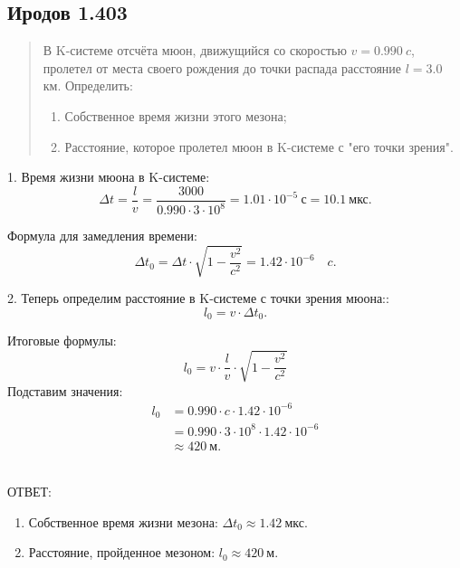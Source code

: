 \subsection*{Иродов 1.403}

\setcounter{equation}{0}

\begin{abstract}
В K-системе отсчёта мюон, движущийся со скоростью $v = 0.990 \ c$, пролетел от места своего рождения до точки распада расстояние $l = 3.0$ км. Определить:
\begin{enumerate}
    \item Собственное время жизни этого мезона;
    \item Расстояние, которое пролетел мюон в K-системе с "его точки зрения".
\end{enumerate}
\end{abstract}

\noindent\hrulefill

1. Время жизни мюона в K-системе:
\begin{equation*}
    \Delta t = \frac{l}{v} = \frac{3000}{0.990 \cdot 3 \cdot 10^8} 
    = 1.01 \cdot 10^{-5} \ \text{с} = 10.1 \ \text{мкс}.
\end{equation*}

Формула для замедления времени:
\begin{equation*}
    \Delta t_0 = \Delta t \cdot \sqrt{1 - \frac{v^2}{c^2}} =  1.42 \cdot 10^{-6} \quad c.
\end{equation*}

2. Теперь определим расстояние в K-системе с точки зрения мюона::
\begin{equation*}
    l_0 = v \cdot \Delta t_0.
\end{equation*}

Итоговые формулы:
\begin{equation*}
    l_0 = v \cdot \frac{l}{v} \cdot \sqrt{1 - \frac{v^2}{c^2}}
\end{equation*}
Подставим значения:
\begin{align*}
    l_0 &= 0.990 \cdot c \cdot 1.42 \cdot 10^{-6} \\
    &= 0.990 \cdot 3 \cdot 10^8 \cdot 1.42 \cdot 10^{-6} \\
    &\approx 420 \ \text{м}.
\end{align*}
\

ОТВЕТ: 
\begin{enumerate}
    \item Собственное время жизни мезона: $\Delta t_0 \approx 1.42 \ \text{мкс}$.
    \item Расстояние, пройденное мезоном: $l_0 \approx 420 \ \text{м}$.
\end{enumerate}
